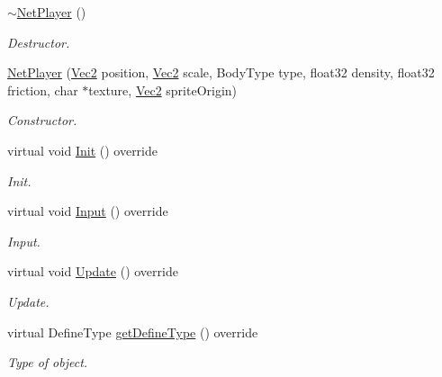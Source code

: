 \begin{DoxyCompactItemize}
\item 
\mbox{\label{class_net_player_a8d1c3511be6810041f9edfe8cc2a4550}} 
\hyperlink{class_net_player_a8d1c3511be6810041f9edfe8cc2a4550}{$\sim$\+Net\+Player} ()
\begin{DoxyCompactList}\small\item\em Destructor. \end{DoxyCompactList}\item 
\mbox{\label{class_net_player_a830c7ea1d195ca6b8da102db00ebd1d7}} 
\hyperlink{class_net_player_a830c7ea1d195ca6b8da102db00ebd1d7}{Net\+Player} (\hyperlink{struct_vec2}{Vec2} position, \hyperlink{struct_vec2}{Vec2} scale, Body\+Type type, float32 density, float32 friction, char $\ast$texture, \hyperlink{struct_vec2}{Vec2} sprite\+Origin)
\begin{DoxyCompactList}\small\item\em Constructor. \end{DoxyCompactList}\item 
\mbox{\label{class_net_player_aeef1b9ebfac0f5cdd926a616a8988ed5}} 
virtual void \hyperlink{class_net_player_aeef1b9ebfac0f5cdd926a616a8988ed5}{Init} () override
\begin{DoxyCompactList}\small\item\em Init. \end{DoxyCompactList}\item 
\mbox{\label{class_net_player_a098fab3ea015117852b7580c7fcc4efd}} 
virtual void \hyperlink{class_net_player_a098fab3ea015117852b7580c7fcc4efd}{Input} () override
\begin{DoxyCompactList}\small\item\em Input. \end{DoxyCompactList}\item 
\mbox{\label{class_net_player_a1d47538e8a532dfcb0cddfba3f081575}} 
virtual void \hyperlink{class_net_player_a1d47538e8a532dfcb0cddfba3f081575}{Update} () override
\begin{DoxyCompactList}\small\item\em Update. \end{DoxyCompactList}\item 
\mbox{\label{class_net_player_ac07584f3a2ece47815aaa863567865cf}} 
virtual Define\+Type \hyperlink{class_net_player_ac07584f3a2ece47815aaa863567865cf}{get\+Define\+Type} () override
\begin{DoxyCompactList}\small\item\em Type of object. \end{DoxyCompactList}\end{DoxyCompactItemize}
